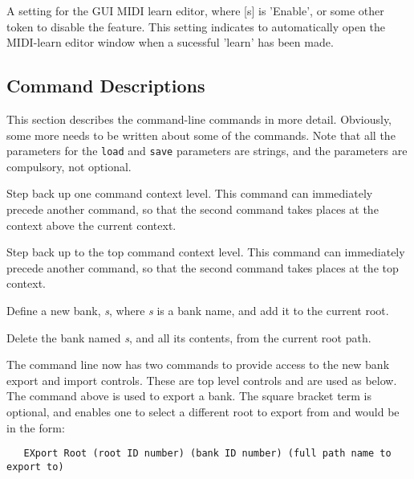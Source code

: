    A setting for the GUI MIDI learn editor, where [s] is 'Enable', or some
   other token to disable the feature.
   This setting indicates to automatically open the MIDI-learn editor window
   when a sucessful 'learn' has been made.

\subsection{Command Descriptions}
\label{subsec:command_line_command_descriptions}

   This section describes the command-line commands in more detail.
   Obviously, some more needs to be written about some of the commands.
   Note that all the parameters for the \texttt{load} and \texttt{save}
   parameters are strings, and the parameters are compulsory, not optional.

   \setcounter{ItemCounter}{0}      %

      Step back up one command context level.
      This command can immediately precede another command, so that the second
      command takes places at the context above the current context.

      Step back up to the top command context level.
      This command can immediately precede another command, so that the second
      command takes places at the top context.

      Define a new bank, \textsl{s}, where \textsl{s} is a bank name,
      and add it to the current root.

      Delete the bank named \textsl{s}, and all its contents,
      from the current root path.

      The command line now has two commands to provide access to the new bank
      export and import controls. These are top level controls and are used as
      below.  The command above is used to export a bank. The square bracket term
      is optional, and enables one to select a different root to export from and
      would be in the form:

\begin{verbatim}
   EXport Root (root ID number) (bank ID number) (full path name to export to)
\end{verbatim}

